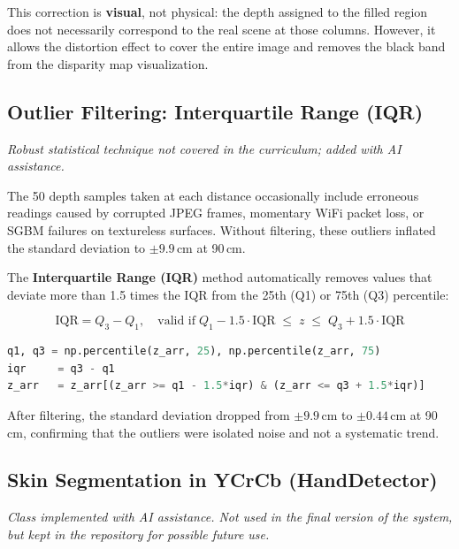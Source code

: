 \documentclass[12pt, a4paper]{article}
\begin{document}
\noindent This correction is \textbf{visual}, not physical: the depth assigned to the
filled region does not necessarily correspond to the real scene at those columns.
However, it allows the distortion effect to cover the entire image and removes the
black band from the disparity map visualization.

\subsection{Outlier Filtering: Interquartile Range (IQR)}
\label{sec:iqr}

\emph{Robust statistical technique not covered in the curriculum; added with AI assistance.}

The 50 depth samples taken at each distance occasionally include erroneous readings
caused by corrupted JPEG frames, momentary WiFi packet loss, or SGBM failures on
textureless surfaces. Without filtering, these outliers inflated the standard deviation
to $\pm9.9$\,cm at 90\,cm.

The \textbf{Interquartile Range (IQR)} method automatically removes values that
deviate more than 1.5 times the IQR from the 25th (Q1) or 75th (Q3) percentile:

\begin{equation}
\label{eq:iqr}
  \text{IQR} = Q_3 - Q_1,
  \quad
  \text{valid if}\;
  Q_1 - 1.5\cdot\text{IQR} \;\leq\; z \;\leq\; Q_3 + 1.5\cdot\text{IQR}
\end{equation}

\begin{lstlisting}[style=cppstyle, language=Python,
  caption={IQR filtering in collect\_measurements.py.}]
q1, q3 = np.percentile(z_arr, 25), np.percentile(z_arr, 75)
iqr     = q3 - q1
z_arr   = z_arr[(z_arr >= q1 - 1.5*iqr) & (z_arr <= q3 + 1.5*iqr)]
\end{lstlisting}

\noindent After filtering, the standard deviation dropped from $\pm9.9$\,cm to
$\pm0.44$\,cm at 90\,cm, confirming that the outliers were isolated noise and
not a systematic trend.

\subsection{Skin Segmentation in YCrCb (HandDetector)}
\label{sec:ycrcb}

\emph{Class implemented with AI assistance. Not used in the final version of the
system, but kept in the repository for possible future use.}
\end{document}
